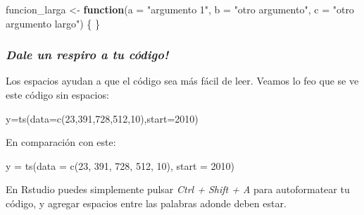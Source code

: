 \documentclass[
]{book}
\newenvironment{Shaded}{\begin{snugshade}}{\end{snugshade}}
\newcommand{\AttributeTok}[1]{\textcolor[rgb]{0.77,0.63,0.00}{#1}}
\newcommand{\ControlFlowTok}[1]{\textcolor[rgb]{0.13,0.29,0.53}{\textbf{#1}}}
\newcommand{\DecValTok}[1]{\textcolor[rgb]{0.00,0.00,0.81}{#1}}
\newcommand{\FunctionTok}[1]{\textcolor[rgb]{0.00,0.00,0.00}{#1}}
\newcommand{\NormalTok}[1]{#1}
\newcommand{\OtherTok}[1]{\textcolor[rgb]{0.56,0.35,0.01}{#1}}
\newcommand{\StringTok}[1]{\textcolor[rgb]{0.31,0.60,0.02}{#1}}
\begin{document}
\begin{Shaded}
\begin{Highlighting}[]
\NormalTok{funcion\_larga }\OtherTok{\textless{}{-}} \ControlFlowTok{function}\NormalTok{(}\AttributeTok{a =} \StringTok{"argumento 1"}\NormalTok{, }
                          \AttributeTok{b =} \StringTok{"otro argumento"}\NormalTok{,}
                          \AttributeTok{c =} \StringTok{"otro argumento largo"}\NormalTok{) \{}
\NormalTok{\}}
\end{Highlighting}
\end{Shaded}

\hypertarget{dale-un-respiro-a-tu-cuxf3digo}{%
\subsubsection{\texorpdfstring{\emph{Dale un respiro a tu código!}}{Dale un respiro a tu código!}}\label{dale-un-respiro-a-tu-cuxf3digo}}

Los espacios ayudan a que el código sea más fácil de leer. Veamos lo feo que se ve este código sin espacios:

\begin{Shaded}
\begin{Highlighting}[]
\NormalTok{y}\OtherTok{=}\FunctionTok{ts}\NormalTok{(}\AttributeTok{data=}\FunctionTok{c}\NormalTok{(}\DecValTok{23}\NormalTok{,}\DecValTok{391}\NormalTok{,}\DecValTok{728}\NormalTok{,}\DecValTok{512}\NormalTok{,}\DecValTok{10}\NormalTok{),}\AttributeTok{start=}\DecValTok{2010}\NormalTok{)}
\end{Highlighting}
\end{Shaded}

En comparación con este:

\begin{Shaded}
\begin{Highlighting}[]
\NormalTok{y }\OtherTok{=} \FunctionTok{ts}\NormalTok{(}\AttributeTok{data =} \FunctionTok{c}\NormalTok{(}\DecValTok{23}\NormalTok{, }\DecValTok{391}\NormalTok{, }\DecValTok{728}\NormalTok{, }\DecValTok{512}\NormalTok{, }\DecValTok{10}\NormalTok{), }\AttributeTok{start =} \DecValTok{2010}\NormalTok{)}
\end{Highlighting}
\end{Shaded}

En Rstudio puedes simplemente pulsar \emph{Ctrl + Shift + A} para autoformatear tu código, y agregar espacios entre las palabras adonde deben estar.

  
\end{document}

